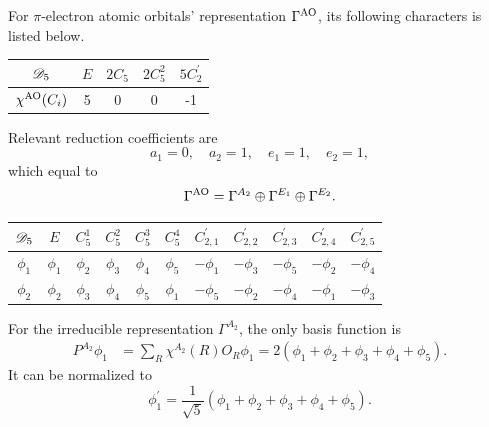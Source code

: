		For $\pi$-electron atomic orbitals' representation $\Gamma^{\rm AO}$, its following characters is listed below.
		\begin{center}
		\setlength{\abovecaptionskip}{-0.3em}
		\begin{tabular}{ccccc}\hline
	$\mathscr{D}_{\rm 5}$	& $E$ & $2C_5$ &	$2C^2_5$	& $5C^\prime_2$ \\ \hline
	$\chi^{{\rm AO}}(C_i)$	&	5	&	0	&	0	&	-1	\\ \hline
		\end{tabular}\vspace*{-0.5em}
		\end{center}
		Relevant reduction coefficients are
		\begin{equation*}
		a_1 = 0, \quad a_2 = 1, \quad e_1 = 1, \quad e_2 = 1,
		\end{equation*}
		which equal to
		\begin{equation*}
			\Gamma^{{\rm AO}} = \Gamma^{A_2} \oplus \Gamma^{E_1} \oplus \Gamma^{E_2}.
		\end{equation*}
		
		\begin{center}
		\begin{tabular}{ccccccccccc}\hline
	$\mathscr{D}_{\rm 5}$ & $E$ & $C^1_5$ & $C^2_5$ & $C^3_5$	&	$C^4_5$	&	$C^\prime_{2,1}$	&	$C^\prime_{2,2}$ &	$C^\prime_{2,3}$	&	$C^\prime_{2,4}$	&	$C^\prime_{2,5}$	\\ \hline
			$\phi_1$	&	$\phi_1$	&	$\phi_2$	&	$\phi_3$	&	$\phi_4$	&	$\phi_5$	&	$-\phi_1$	&	$-\phi_3$	&	$-\phi_5$	&	$-\phi_2$	&	$-\phi_4$	\\
			$\phi_2$	&	$\phi_2$	&	$\phi_3$	&	$\phi_4$	&	$\phi_5$	&	$\phi_1$	&	$-\phi_5$	&	$-\phi_2$	&	$-\phi_4$	&	$-\phi_1$	&	$-\phi_3$	\\ \hline
		\end{tabular}
		\end{center}
		
		For the irreducible representation $\Gamma^{A_2}$, the only basis function is
		\begin{align*}
			P^{A_2}\phi_1 &= \sum_{R} \chi^{A_2}(R) O_R \phi_1 = 2(\phi_1 + \phi_2 + \phi_3 + \phi_4 + \phi_5).
		\end{align*}
		It can be normalized to
		\begin{equation}
			\phi^\prime_1 = \frac{1}{\sqrt{5}}(\phi_1 + \phi_2 + \phi_3 + \phi_4 + \phi_5).
		\end{equation}
		
